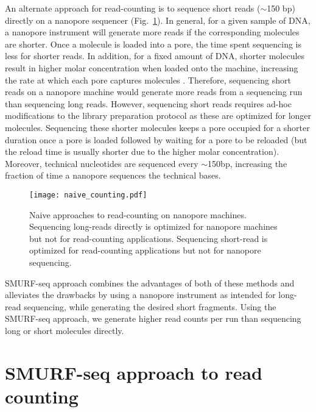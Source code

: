 An alternate approach for read-counting is to sequence short reads
($\sim$150 bp) directly on a nanopore sequencer
(Fig.~\ref{naive_counting}).
In general, for a given sample of DNA, a nanopore instrument will
generate more reads if the corresponding molecules are shorter.  Once a
molecule is loaded into a pore, the time spent sequencing is less for
shorter reads. In addition, for a fixed amount of DNA, shorter molecules
result in higher molar concentration when loaded onto the machine,
increasing the rate at which each pore captures molecules
\citep{muthukumar2010theory,wanunu2008dna}. Therefore, sequencing short
reads on a nanopore machine would generate more reads from a sequencing
run than sequencing long reads.
However, sequencing short reads requires ad-hoc modifications to the
library preparation protocol as these are optimized for longer
molecules.  Sequencing these shorter molecules keeps a pore occupied for
a shorter duration once a pore is loaded followed by waiting for a pore
to be reloaded (but the reload time is usually shorter due to the higher
molar concentration). Moreover, technical nucleotides are sequenced
every $\sim$150bp, increasing the fraction of time a nanopore sequences
the technical bases.

\begin{figure}[b!]
\centering
\texttt{[image: naive\_counting.pdf]}
\caption[Naive approaches to read-counting on nanopore machines]{
  Naive approaches to read-counting on nanopore machines.
  Sequencing long-reads directly is optimized for nanopore machines but
  not for read-counting applications.
  Sequencing short-read is optimized for read-counting applications but
  not for nanopore sequencing.}
\label{naive_counting}
\end{figure}

SMURF-seq approach combines the advantages of both of these methods
and alleviates the drawbacks by using a nanopore instrument as
intended for long-read sequencing, while generating the desired short
fragments. Using the SMURF-seq approach, we generate higher read counts
per run than sequencing long or short molecules directly.


\section{SMURF-seq approach to read counting}

